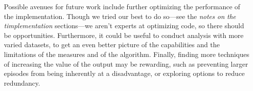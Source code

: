 Possible avenues for future work include further optimizing the performance of the implementation. Though we tried our best to do so---see the \emph{notes on the timplementation} sections---we aren't experts at optimizing code, so there should be opportunities. Furthermore, it could be useful to conduct analysis with more varied datasets, to get an even better picture of the capabilities and the limitations of the measures and of the algorithm. Finally, finding more techniques of increasing the value of the output may be rewarding, such as preventing larger episodes from being inherently at a disadvantage, or exploring options to reduce redundancy.
